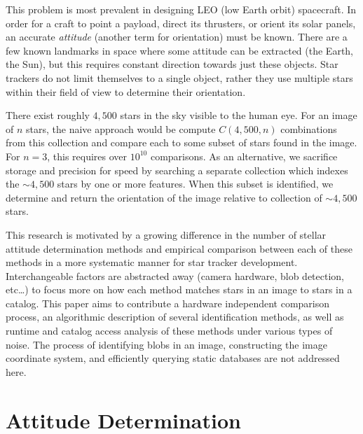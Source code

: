 \documentclass[conference]{IEEEtran}
\begin{document}
    This problem is most prevalent in designing LEO (low Earth orbit) spacecraft.
    In order for a craft to point a payload, direct its thrusters, or orient its solar panels, an accurate
    \textit{attitude} (another term for orientation) must be known.
    There are a few known landmarks in space where some attitude can be extracted (the Earth, the Sun), but this
    requires constant direction towards just these objects.
    Star trackers do not limit themselves to a single object, rather they use multiple stars within their field of view
    to determine their orientation.

    \newcommand{\seq}{\!=\!}
    There exist roughly $4{,}500$ stars in the sky visible to the human eye.
    For an image of $n$ stars, the naive approach would be compute $C(4{,}500, n)$ combinations from this collection and
    compare each to some subset of stars found in the image.
    For $n\seq 3$, this requires over $10^{10}$ comparisons.
    As an alternative, we sacrifice storage and precision for speed by searching a separate collection which indexes the
    ${\sim}4{,}500$ stars by one or more features.
    When this subset is identified, we determine and return the orientation of the image relative to collection
    of ${\sim}4{,}500$ stars.

    This research is motivated by a growing difference in the number of stellar attitude determination methods and
    empirical comparison between each of these methods in a more systematic manner for star tracker development.
    Interchangeable factors are abstracted away (camera hardware, blob detection, etc\ldots) to focus more on how each
    method matches stars in an image to stars in a catalog.
    This paper aims to contribute a hardware independent comparison process, an algorithmic description of several
    identification methods, as well as runtime and catalog access analysis of these methods under various types of noise.
    The process of identifying blobs in an image, constructing the image coordinate system, and efficiently querying
    static databases are not addressed here.

    \newcommand{\iFrame}{\mathcal{I}}
    \newcommand{\kFrame}{\mathcal{K}}
    \newcommand{\vv}[1]{#1} %

    \section{Attitude Determination}\label{sec:attitudeDetermination}
\end{document}
